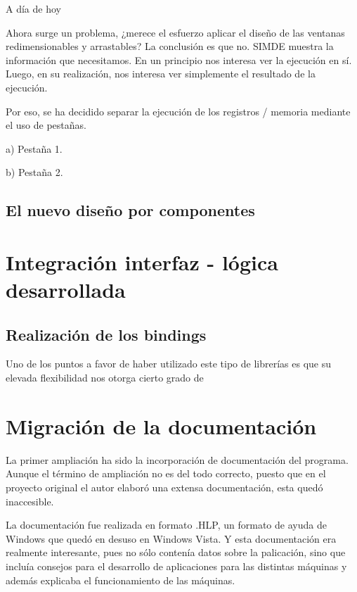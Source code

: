 A día de hoy 

\bigskip
Ahora surge un problema, ¿merece el esfuerzo aplicar el diseño de las ventanas redimensionables y 
arrastables? La conclusión es que no. SIMDE muestra la información que necesitamos. En un 
principio nos interesa ver la ejecución en sí. Luego, en su realización, nos interesa ver simplemente
el resultado de la ejecución.

\bigskip
Por eso, se ha decidido separar la ejecución de los registros / memoria mediante el uso de pestañas.

a) Pestaña 1.

b) Pestaña 2.

\subsection{El nuevo diseño por componentes}

\section{Integración interfaz - lógica desarrollada}
\label{5:sec4} 

\subsection{Realización de los bindings}
Uno de los puntos a favor de haber utilizado este tipo de librerías es que su elevada flexibilidad
nos otorga cierto grado de 

\section{Migración de la documentación}
\label{5:sec5} 

La primer ampliación ha sido la incorporación de documentación del programa. Aunque el
término de ampliación no es del todo correcto, puesto que en el proyecto original el autor
elaboró una extensa documentación, esta quedó inaccesible.

\bigskip
La documentación fue realizada en formato .HLP, un formato de ayuda de Windows que quedó
en desuso en Windows Vista. Y esta documentación era realmente interesante, pues no sólo
contenía datos sobre la palicación, sino que incluía consejos para el desarrollo de 
aplicaciones para las distintas máquinas y además explicaba el funcionamiento de las máquinas.


